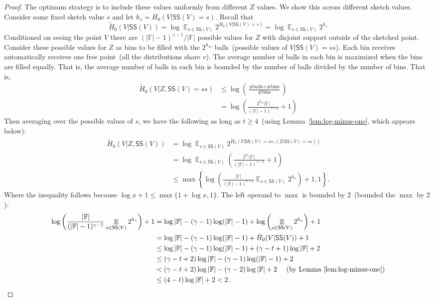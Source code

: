 \documentclass[11pt]{article}
\newcommand{\lemref}[1]{\mbox{Lemma~\ref{#1}}}
\DeclareMathOperator*{\expe}{\mathbb{E}}
\newcommand{\class}[1]{{\ensuremath{\mathsf{#1}}}}
\newcommand{\sketch}{\ensuremath{\class{SS}}\xspace}
\begin{document}
\begin{proof}
The optimum strategy is to include these values uniformly from different $Z$ values.
We show this across different sketch values.  Consider some fixed sketch value $s$ and let $h_s= H_0(V | \sketch(V) = s)$.  %
Recall that 
\[
\tilde{H}_0(V | \sketch(V)) =  \log \expe_{s\in \sketch(V)} 2^{H_0(V | \sketch(V) = s)}  = \log \expe_{s\in \sketch(V)} 2^{h_s} %
\]  
Conditioned on seeing the point $V$ there are $(|\mathbb{F}|-1)^{\gamma-1}/|\mathbb{F}|$ possible values for $Z$ with disjoint support outside of the sketched point.  Consider these possible values for $Z$ as bins to be filled with the $2^{h_{ss}}$ balls~(possible values of $V | \sketch(V)=ss$).  Each bin receives automatically receives one free point~(all the distributions share $v$).  The average number of balls in each bin is maximized when the bins are filled equally.  That is, the average number of balls in each bin is bounded by the number of balls divided by the number of bins.  That is, 
\begin{align*}
\tilde{H}_0(V |Z  , \sketch(V) = ss) &\le \log \left(\frac{\text{\# balls}+\text{\# bins}}{\text{\# bins}}\right)\\
&= \log \left(\frac{2^{h_{ss}}|\mathbb{F}|}{(|\mathbb{F}|-1)^{\gamma-1}} +1 \right)
\end{align*}
Then averaging over the possible values of $s$, we have the following as long as $t\ge 4$~(using  \lemref{lem:log-minus-one}, which appears below):
\begin{align*}
\tilde{H}_0(V |Z , \sketch(V) ) &= \log \expe_{s\in \sketch(V)} 2^{\tilde{H}_0(V |  \sketch(V) =ss , (Z| \sketch(V) =ss) )}\\
&= \log\expe_{s\in \sketch(V)} \left(\frac{2^{h_s}|\mathbb{F}|}{(|\mathbb{F}|-1)^{\gamma-1}} +1\right)\\
&\le \max\left\{ \log \left(\frac{|\mathbb{F}|}{(|\mathbb{F}|-1)^{\gamma-1}} \expe_{s\in \sketch(V)} 2^{h_s}\right)+1, 1\right\}.
\end{align*}
Where the inequality follows because $\log x+1 \le \max\{ 1+ \log x,1\}$.
The left operand to $\max$ is bounded by $2$~(bounded the $\max$ by $2$):
\begin{align*}
\log \left(\frac{|\mathbb{F}|}{(|\mathbb{F}|-1)^{\gamma-1}} \expe_{s\in \sketch(V)} 2^{h_s}\right)+1
&=\log |\mathbb{F}| - (\gamma -1)\log (|\mathbb{F}|-1) + \log \left(\expe_{s\in \sketch(V)} 2^{h_s}\right) +1\\
&=\log |\mathbb{F}| - (\gamma -1)\log (|\mathbb{F}|-1) + \tilde{H}_0(V | \sketch(V)) +1 \\ 
&\le \log |\mathbb{F}| - (\gamma -1)\log (|\mathbb{F}|-1) + (\gamma-t+1)\log |\mathbb{F}|+2\\
&\le (\gamma-t+2)\log |\mathbb{F}| - (\gamma-1) \log (|\mathbb{F}|-1)+2\\
&< (\gamma-t+2)\log |\mathbb{F}| - (\gamma-2) \log |\mathbb{F}| +2 \ \ \ \ \mbox{(by \lemref{lem:log-minus-one})}\\
&\le (4-t)\log |\mathbb{F}| +2< 2\,.
\end{align*}
\end{proof}
\end{document}
